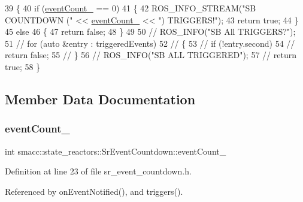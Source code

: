 \begin{DoxyCode}
39 \{
40     \textcolor{keywordflow}{if} (\hyperlink{classsmacc_1_1state__reactors_1_1SrEventCountdown_aa3b1de656f3d3cadadc47f00c4e0be86}{eventCount\_} == 0)
41     \{
42         ROS\_INFO\_STREAM(\textcolor{stringliteral}{"SB COUNTDOWN ("} << \hyperlink{classsmacc_1_1state__reactors_1_1SrEventCountdown_aa3b1de656f3d3cadadc47f00c4e0be86}{eventCount\_} << \textcolor{stringliteral}{") TRIGGERS!"});
43         \textcolor{keywordflow}{return} \textcolor{keyword}{true};
44     \}
45     \textcolor{keywordflow}{else}
46     \{
47         \textcolor{keywordflow}{return} \textcolor{keyword}{false};
48     \}
49 
50     \textcolor{comment}{// ROS\_INFO("SB All TRIGGERS?");}
51     \textcolor{comment}{// for (auto &entry : triggeredEvents)}
52     \textcolor{comment}{// \{}
53     \textcolor{comment}{//     if (!entry.second)}
54     \textcolor{comment}{//         return false;}
55     \textcolor{comment}{// \}}
56     \textcolor{comment}{// ROS\_INFO("SB ALL TRIGGERED");}
57     \textcolor{comment}{// return true;}
58 \}
\end{DoxyCode}


\subsection{Member Data Documentation}
\mbox{\label{classsmacc_1_1state__reactors_1_1SrEventCountdown_aa3b1de656f3d3cadadc47f00c4e0be86}} 
\subsubsection{\texorpdfstring{event\+Count\+\_\+}{eventCount\_}}
{\footnotesize\ttfamily int smacc\+::state\+\_\+reactors\+::\+Sr\+Event\+Countdown\+::event\+Count\+\_\+\hspace{0.3cm}{\ttfamily [private]}}



Definition at line 23 of file sr\+\_\+event\+\_\+countdown.\+h.



Referenced by on\+Event\+Notified(), and triggers().


